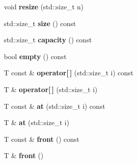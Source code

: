\begin{DoxyCompactItemize}
\item 
\hypertarget{classpel_1_1vector_a8e807a5dcaf4af48871809215b59b520}{}void {\bfseries resize} (std\+::size\+\_\+t n)\label{classpel_1_1vector_a8e807a5dcaf4af48871809215b59b520}

\item 
\hypertarget{classpel_1_1vector_ac9cbbc2ac73f57b8cf0c77263b444d36}{}std\+::size\+\_\+t {\bfseries size} () const \label{classpel_1_1vector_ac9cbbc2ac73f57b8cf0c77263b444d36}

\item 
\hypertarget{classpel_1_1vector_adc3c5327a261e30c3ddab180fb99eedb}{}std\+::size\+\_\+t {\bfseries capacity} () const \label{classpel_1_1vector_adc3c5327a261e30c3ddab180fb99eedb}

\item 
\hypertarget{classpel_1_1vector_a6b067a85ab90ad276b30c1cfab2668c2}{}bool {\bfseries empty} () const \label{classpel_1_1vector_a6b067a85ab90ad276b30c1cfab2668c2}

\item 
\hypertarget{classpel_1_1vector_a1030f05f74517e314f03da01790b3646}{}T const \& {\bfseries operator\mbox{[}$\,$\mbox{]}} (std\+::size\+\_\+t i) const \label{classpel_1_1vector_a1030f05f74517e314f03da01790b3646}

\item 
\hypertarget{classpel_1_1vector_a43c09c8756de1de4907af3afdd9008c2}{}T \& {\bfseries operator\mbox{[}$\,$\mbox{]}} (std\+::size\+\_\+t i)\label{classpel_1_1vector_a43c09c8756de1de4907af3afdd9008c2}

\item 
\hypertarget{classpel_1_1vector_ad2f056872a85972a37a185809f242fd4}{}T const \& {\bfseries at} (std\+::size\+\_\+t i) const \label{classpel_1_1vector_ad2f056872a85972a37a185809f242fd4}

\item 
\hypertarget{classpel_1_1vector_a4734bc3fbce0209ac2cfb6d97b13e56e}{}T \& {\bfseries at} (std\+::size\+\_\+t i)\label{classpel_1_1vector_a4734bc3fbce0209ac2cfb6d97b13e56e}

\item 
\hypertarget{classpel_1_1vector_a100aab0df66e97e4db800a3f927518cb}{}T const \& {\bfseries front} () const \label{classpel_1_1vector_a100aab0df66e97e4db800a3f927518cb}

\item 
\hypertarget{classpel_1_1vector_aa7c9b4f3402b9a148205b9b061890600}{}T \& {\bfseries front} ()\label{classpel_1_1vector_aa7c9b4f3402b9a148205b9b061890600}


\end{DoxyCompactItemize}
